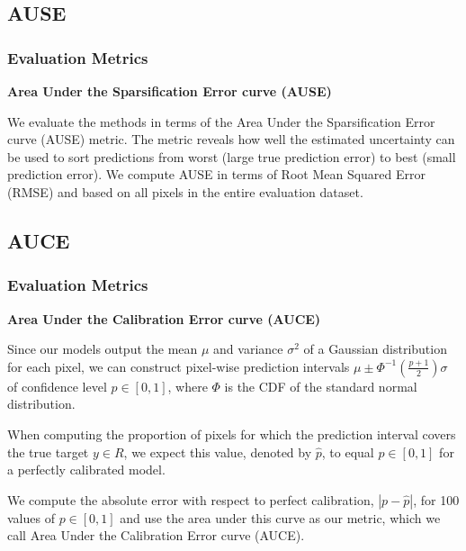 \documentclass{beamer}
\begin{document}
\subsection{AUSE}
\begin{frame}
\frametitle{Evaluation Metrics}

\textbf{Area Under the Sparsification Error curve (AUSE)}

\vspace{0.3cm}

We evaluate the methods in terms of the Area Under the Sparsification Error curve (AUSE) metric. The metric reveals how well the estimated uncertainty can be used to sort predictions from worst (large true prediction error) to best (small prediction error). We compute AUSE in terms of Root Mean Squared Error (RMSE) and based on all pixels in the entire evaluation dataset.

\end{frame}




\subsection{AUCE}
\begin{frame}
\frametitle{Evaluation Metrics}

\textbf{Area Under the Calibration Error curve (AUCE)}

\vspace{0.3cm}

\hspace{0.3cm} Since our models output the mean $\mu$ and variance $\sigma^2$ of a Gaussian distribution for each pixel, we can construct pixel-wise prediction intervals $\mu \pm \Phi^{-1} (\frac{p+1}{2}) \sigma$ of confidence level $p \in [0,1]$, where $\Phi$ is the CDF of the standard normal distribution. 

\vspace{0.3cm}

\hspace{0.3cm} When computing the proportion of pixels for which the prediction interval covers the true target $y \in R$, we expect this value, denoted by $\hat{p}$, to equal $p \in [0,1]$ for a perfectly calibrated model. 

\vspace{0.3cm}

\hspace{0.3cm} We compute the absolute error with respect to perfect calibration, $|p - \hat{p} |$, for 100 values of $p \in [0,1]$ and use the area under this curve as our metric, which we call Area Under the Calibration Error curve (AUCE).


\end{frame}
\end{document}
